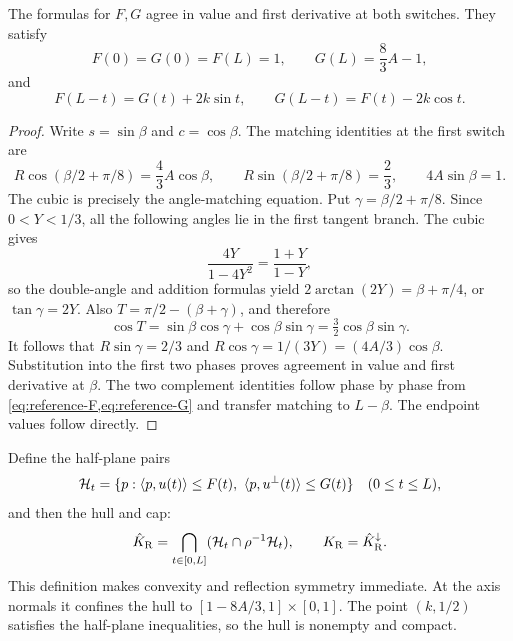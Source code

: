 \begin{lemma}\label{lem:reference-matching}
The formulas for $F,G$ agree in value and first derivative at both
switches. They satisfy
\[
 F(0)=G(0)=F(L)=1,\qquad G(L)=\frac83A-1,
\]
and
\[
 F(L-t)=G(t)+2k\sin t,\qquad
 G(L-t)=F(t)-2k\cos t.
\]
\end{lemma}
\begin{proof}
Write $s=\sin\beta$ and $c=\cos\beta$. The matching identities
at the first switch are
\[
 R\cos(\beta/2+\pi/8)=\frac43A\cos\beta,
 \qquad R\sin(\beta/2+\pi/8)=\frac23,
 \qquad 4A\sin\beta=1.
\]
The cubic is precisely the angle-matching equation. Put
$\gamma=\beta/2+\pi/8$. Since $0<Y<1/3$, all the following
angles lie in the first tangent branch. The cubic gives
\[
 \frac{4Y}{1-4Y^2}=\frac{1+Y}{1-Y},
\]
so the double-angle and addition formulas yield
$2\arctan(2Y)=\beta+\pi/4$, or $\tan\gamma=2Y$.
Also $T=\pi/2-(\beta+\gamma)$, and therefore
\[
 \cos T=\sin\beta\cos\gamma+\cos\beta\sin\gamma
        =\tfrac32\cos\beta\sin\gamma.
\]
It follows that $R\sin\gamma=2/3$ and
$R\cos\gamma=1/(3Y)=(4A/3)\cos\beta$.
Substitution into
the first two phases proves agreement in value and first derivative
at $\beta$. The two complement
identities follow phase by phase from \cref{eq:reference-F,eq:reference-G}
and transfer matching to $L-\beta$. The endpoint values follow
directly.
\end{proof}

Define the half-plane pairs
\[
 \mathcal H_t=\{p:\langle p,u(t)\rangle\le F(t),\
                    \langle p,u^\perp(t)\rangle\le G(t)\}
 \quad(0\le t\le L),
\]
and then the hull and cap:
\begin{equation}\label{eq:reference-hull}
 \hat K_{\mathrm R}=\bigcap_{t\in[0,L]}(\mathcal H_t\cap\rho^{-1}\mathcal H_t),
 \qquad K_{\mathrm R}=\hat K_{\mathrm R}^\downarrow.
\end{equation}
This definition makes convexity and reflection symmetry immediate.
At the axis normals it confines the hull to
$[1-8A/3,1]\times[0,1]$. The point $(k,1/2)$ satisfies the
half-plane inequalities, so the hull is nonempty and compact.

